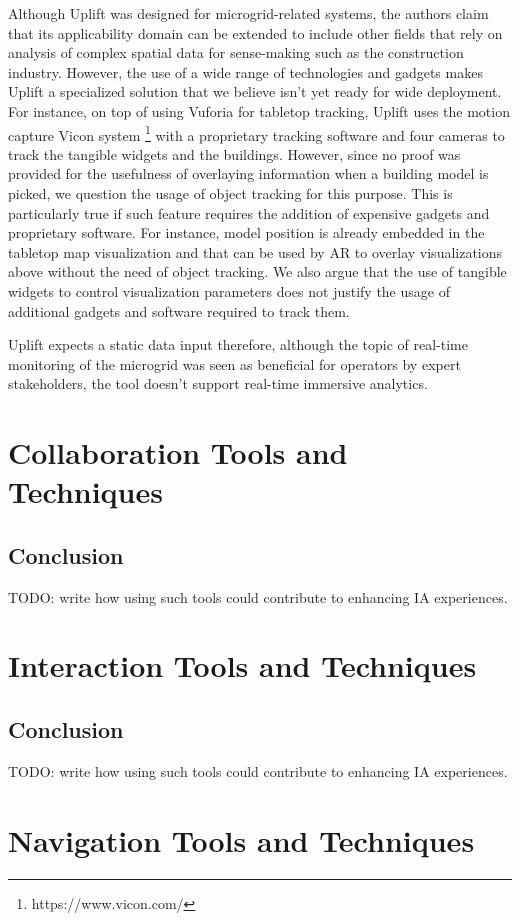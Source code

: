 \documentclass{vgtc}                          %
\begin{document}
\noindent Although Uplift was designed for microgrid-related systems,
the authors claim that its applicability domain can be extended to include
other fields that rely on analysis of complex spatial data for sense-making
such as the construction industry. However, the use of a wide range of technologies
and gadgets makes Uplift a specialized solution that we believe isn't yet
ready for wide deployment. For instance, on top of using Vuforia for tabletop
tracking, Uplift uses the motion capture Vicon system
\footnote{https://www.vicon.com/} with a proprietary tracking software and four
cameras to track the tangible widgets and the buildings. However,
since no proof was provided for the usefulness of overlaying information when
a building model is picked, we question the usage of object tracking for this
purpose. This is particularly true if such feature requires the addition of
expensive gadgets and proprietary software. For instance, model position is
already embedded in the tabletop map visualization and that can be used by AR
to overlay visualizations above without the need of object tracking. We also
argue that the use of tangible widgets to control visualization parameters does
not justify the usage of additional gadgets and software required to track
them.

\medskip

\noindent Uplift expects a static data input therefore, although the topic of
real-time monitoring of the microgrid was seen as beneficial for operators by
expert stakeholders, the tool doesn't support real-time immersive analytics.

\section{Collaboration Tools and Techniques}
\subsection{Conclusion}
TODO: write how using such tools could contribute to enhancing IA experiences.
\section{Interaction Tools and Techniques}
\subsection{Conclusion}
TODO: write how using such tools could contribute to enhancing IA experiences.
\section{Navigation Tools and Techniques}
\end{document}
